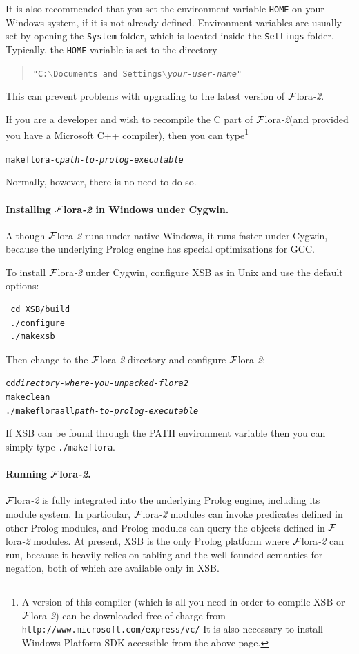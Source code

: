\documentclass[11pt]{article}
\newcommand{\FLORA}{{\mbox{\sc ${\cal F}${lora}\rm\emph{-2}}}\xspace}
\begin{document}
It is also recommended that you set the environment variable {\tt HOME} on
your Windows system, if it is not already defined. Environment variables
are usually set by opening the {\tt System} folder, which is located inside
the {\tt Settings} folder. Typically, the {\tt HOME} variable is set to the
directory
\begin{quote}
{\tt "C:$\backslash$Documents and Settings$\backslash$\emph{your-user-name}"} 
\end{quote}
This can prevent problems with upgrading to the latest version of \FLORA.

If you are a developer and wish to recompile the C part of \FLORA (and
provided you have a Microsoft C++ compiler), then you can type\footnote{
  A version of this compiler (which is all you need in order to compile XSB
  or \FLORA) can be downloaded free of charge from {\tt
    http://www.microsoft.com/express/vc/} It is
  also necessary to install Windows Platform SDK accessible from the above
  page.
  }
\begin{alltt}
   makeflora -c \emph{path-to-prolog-executable}
\end{alltt}
Normally, however, there is no need to do so.


\paragraph{Installing \FLORA in Windows under Cygwin.}

Although \FLORA runs under native Windows, it runs faster under Cygwin,
because the underlying Prolog engine has special optimizations for GCC.

To install \FLORA under Cygwin, configure XSB as in Unix and use the
default options:
\begin{verbatim}
 cd XSB/build
 ./configure
 ./makexsb
\end{verbatim}
Then change to the \FLORA directory and configure \FLORA:
\begin{alltt}
   cd \emph{directory-where-you-unpacked-flora2}
   make clean
   ./makeflora all \emph{path-to-prolog-executable}
\end{alltt}
If XSB can be found through the PATH environment variable then you can
simply type {\tt ./makeflora}.


\paragraph{Running \FLORA.}
\FLORA is fully integrated into the underlying Prolog engine, including its
module system. In particular, \FLORA modules can invoke predicates defined in
other Prolog modules, and Prolog modules can query the objects defined in
\FLORA modules. At present, XSB is the only Prolog platform where \FLORA
can run, because it heavily relies on tabling and the well-founded
semantics for negation, both of which are available only in XSB.
\end{document}
